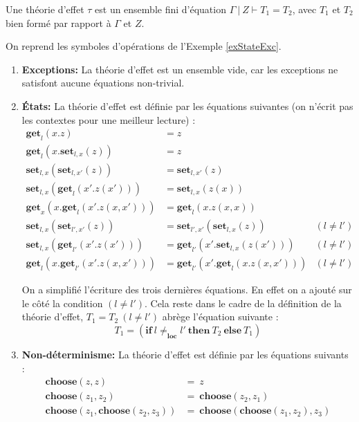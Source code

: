 	Une théorie d'effet $\tau$ est un ensemble fini d'équation $\Gamma~|~Z \vdash T_1 = T_2$, avec $T_1$ et $T_2$ bien formé par rapport à $\Gamma$ et $Z$.
	
	\begin{exemple}
		On reprend les symboles d'opérations de l'Exemple \ref{exStateExc}.
		
		\begin{enumerate}
			\item[] \textbf{Exceptions:} La théorie d'effet est un ensemble vide, car les exceptions ne satisfont aucune équations non-trivial.
			
			\item[] \textbf{États:} La théorie d'effet est définie par les équations suivantes (on n'écrit pas les contextes pour une meilleur lecture) :
			\begin{align*}
				\textbf{get}_l(x.z) &= z\\	
				\textbf{get}_l(x.\textbf{set}_{l,x}(z)) &= z\\	
				\textbf{set}_{l,x}(\textbf{set}_{l,x'}(z)) &= \textbf{set}_{l,x'}(z)\\
				\textbf{set}_{l,x}(\textbf{get}_{l}(x'.z(x'))) &= \textbf{set}_{l,x}(z(x))\\
				\textbf{get}_{x}(x.\textbf{get}_{l}(x'.z(x,x'))) &= \textbf{get}_{l}(x.z(x,x))\\
				\textbf{set}_{l,x}(\textbf{set}_{l',x'}(z)) &= 
				\textbf{set}_{l',x'}(\textbf{set}_{l,x}(z)) & (l \neq l')\\
				\textbf{set}_{l,x}(\textbf{get}_{l'}(x'.z(x'))) &= 
				\textbf{get}_{l'}(x'.\textbf{set}_{l,x}(z(x'))) & (l \neq l')\\
				\textbf{get}_{l}(x.\textbf{get}_{l'}(x'.z(x,x'))) &= 
				\textbf{get}_{l'}(x'.\textbf{get}_{l}(x.z(x,x'))) & (l \neq l')
			\end{align*}
		
			On a simplifié l'écriture des trois dernières équations. En effet on a ajouté sur le côté la condition $(l \neq l')$. Cela reste dans le cadre de la définition de la théorie d'effet, $T_1 = T_2~(l \neq l')$ abrège l'équation suivante :
			\[T_1 = (\textbf{if}~l \neq_\textbf{loc} l'~\textbf{then}~T_2~\textbf{else}~T_1)\]
			
			\item[] \textbf{Non-déterminisme:} La théorie d'effet est définie par les équations suivants :  
			\begin{align*}
				\textbf{choose}(z,z) &=~z\\
				\textbf{choose}(z_1,z_2) &=~\textbf{choose}(z_2,z_1)\\
				\textbf{choose}(z_1,\textbf{choose}(z_2,z_3)) &=~\textbf{choose}(\textbf{choose}(z_1,z_2),z_3)
			\end{align*}
		

\end{enumerate}
\end{exemple}
